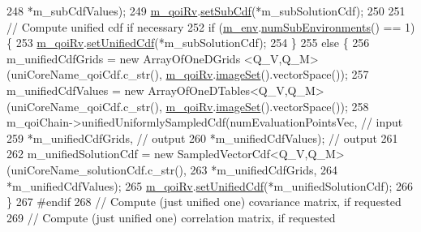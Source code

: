 \begin{DoxyCode}
248                                                           *m\_subCdfValues);
249   \hyperlink{class_q_u_e_s_o_1_1_statistical_forward_problem_aa9ce415e5be95e04d6eea53c48fdea2c}{m\_qoiRv}.\hyperlink{class_q_u_e_s_o_1_1_generic_vector_r_v_ab4d13e93cf8b2bf9d61c6fcf6306858e}{setSubCdf}(*m\_subSolutionCdf);
250 
251   \textcolor{comment}{// Compute unified cdf if necessary}
252   \textcolor{keywordflow}{if} (\hyperlink{class_q_u_e_s_o_1_1_statistical_forward_problem_ab8dc530366735e9ca11290e37f95996a}{m\_env}.\hyperlink{class_q_u_e_s_o_1_1_base_environment_ac0345f57e31ef7833e379ed972bd094d}{numSubEnvironments}() == 1) \{
253     \hyperlink{class_q_u_e_s_o_1_1_statistical_forward_problem_aa9ce415e5be95e04d6eea53c48fdea2c}{m\_qoiRv}.\hyperlink{class_q_u_e_s_o_1_1_generic_vector_r_v_aa92eb9b8bff6cf9d82e32c98b4b7b0c9}{setUnifiedCdf}(*m\_subSolutionCdf);
254   \}
255   \textcolor{keywordflow}{else} \{
256     m\_unifiedCdfGrids  = \textcolor{keyword}{new} ArrayOfOneDGrids <Q\_V,Q\_M>(uniCoreName\_qoiCdf.c\_str(),
      \hyperlink{class_q_u_e_s_o_1_1_statistical_forward_problem_aa9ce415e5be95e04d6eea53c48fdea2c}{m\_qoiRv}.\hyperlink{class_q_u_e_s_o_1_1_base_vector_r_v_aa4dd2f036228eac1f945bacc7147a922}{imageSet}().vectorSpace());
257     m\_unifiedCdfValues = \textcolor{keyword}{new} ArrayOfOneDTables<Q\_V,Q\_M>(uniCoreName\_qoiCdf.c\_str(),
      \hyperlink{class_q_u_e_s_o_1_1_statistical_forward_problem_aa9ce415e5be95e04d6eea53c48fdea2c}{m\_qoiRv}.\hyperlink{class_q_u_e_s_o_1_1_base_vector_r_v_aa4dd2f036228eac1f945bacc7147a922}{imageSet}().vectorSpace());
258     m\_qoiChain->unifiedUniformlySampledCdf(numEvaluationPointsVec, \textcolor{comment}{// input}
259                                            *m\_unifiedCdfGrids,     \textcolor{comment}{// output}
260                                            *m\_unifiedCdfValues);   \textcolor{comment}{// output}
261 
262     m\_unifiedSolutionCdf = \textcolor{keyword}{new} SampledVectorCdf<Q\_V,Q\_M>(uniCoreName\_solutionCdf.c\_str(),
263                                                                 *m\_unifiedCdfGrids,
264                                                                 *m\_unifiedCdfValues);
265     \hyperlink{class_q_u_e_s_o_1_1_statistical_forward_problem_aa9ce415e5be95e04d6eea53c48fdea2c}{m\_qoiRv}.\hyperlink{class_q_u_e_s_o_1_1_generic_vector_r_v_aa92eb9b8bff6cf9d82e32c98b4b7b0c9}{setUnifiedCdf}(*m\_unifiedSolutionCdf);
266   \}
267 \textcolor{preprocessor}{#endif}
268 \textcolor{preprocessor}{}  \textcolor{comment}{// Compute (just unified one) covariance matrix, if requested}
269   \textcolor{comment}{// Compute (just unified one) correlation matrix, if requested}

\end{DoxyCode}
